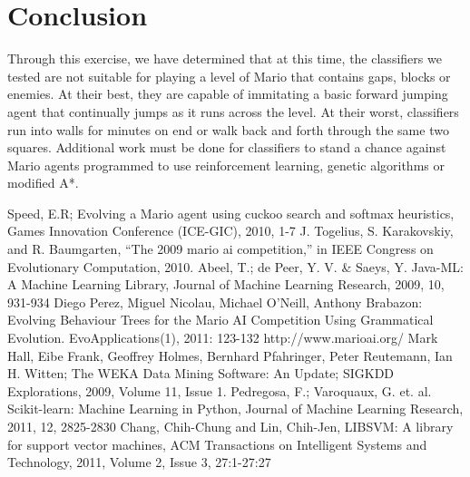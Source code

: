 \documentclass[]{article}   %
\begin{document}
\section{Conclusion}

Through this exercise, we have determined that at this time, the classifiers we tested are not suitable for playing a level of Mario that contains gaps, blocks or enemies.
At their best, they are capable of immitating a basic forward jumping agent that continually jumps as it runs across the level. At their worst, classifiers run into walls for
minutes on end or walk back and forth through the same two squares. Additional work must be done for classifiers to stand a chance against Mario agents programmed to use
reinforcement learning, genetic algorithms or modified A*.


\begin{thebibliography}{9}
  Speed, E.R; Evolving a Mario agent using cuckoo search and softmax heuristics, Games Innovation Conference (ICE-GIC), 2010, 1-7
  J. Togelius, S. Karakovskiy, and R. Baumgarten, “The 2009 mario ai competition,” in IEEE Congress on Evolutionary Computation, 2010.
  Abeel, T.; de Peer, Y. V. \& Saeys, Y. Java-ML: A Machine Learning Library, Journal of Machine Learning Research, 2009, 10, 931-934
  Diego Perez, Miguel Nicolau, Michael O'Neill, Anthony Brabazon: Evolving Behaviour Trees for the Mario AI Competition Using Grammatical Evolution. EvoApplications(1), 2011: 123-132 http://www.marioai.org/
  Mark Hall, Eibe Frank, Geoffrey Holmes, Bernhard Pfahringer, Peter Reutemann, Ian H. Witten; The WEKA Data Mining Software: An Update; SIGKDD Explorations, 2009, Volume 11, Issue 1.
  Pedregosa, F.; Varoquaux, G. et. al. Scikit-learn: Machine Learning in Python, Journal of Machine Learning Research, 2011, 12, 2825-2830
  Chang, Chih-Chung and Lin, Chih-Jen, {LIBSVM}: A library for support vector machines, ACM Transactions on Intelligent Systems and Technology, 2011, Volume 2, Issue 3, 27:1-27:27
\end{thebibliography}
\end{document}

